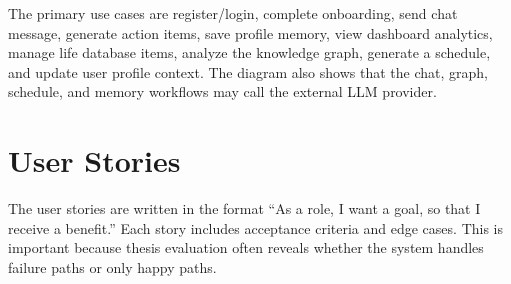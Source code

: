 
The primary use cases are register/login, complete onboarding, send chat message, generate action items, save profile memory, view dashboard analytics, manage life database items, analyze the knowledge graph, generate a schedule, and update user profile context. The diagram also shows that the chat, graph, schedule, and memory workflows may call the external LLM provider.

\section{User Stories}

The user stories are written in the format ``As a role, I want a goal, so that I receive a benefit.'' Each story includes acceptance criteria and edge cases. This is important because thesis evaluation often reveals whether the system handles failure paths or only happy paths.

